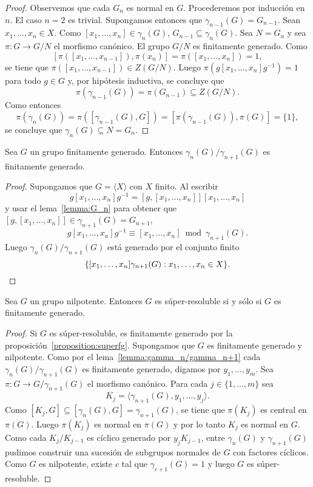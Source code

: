 \begin{proof}
	Observemos que cada $G_n$ es normal en $G$.  Procederemos por inducción en
	$n$. El caso $n=2$ es trivial. Supongamos entonces que
	$\gamma_{n-1}(G)=G_{n-1}$. Sean $x_1,\dots,x_n\in X$. Como
	$[x_1,\dots,x_n]\in\gamma_{n}(G)$, $G_{n-1}\subseteq\gamma_n(G)$. Sea
	$N=G_n$ y sea $\pi\colon G\to G/N$ el morfismo canónico. El grupo $G/N$ es
	finitamente generado. Como
	\[
	[\pi([x_1,\dots,x_{n-1}]),\pi(x_n)]=\pi([x_1,\dots,x_n])=1,
	\]
	se tiene que $\pi([x_1,\dots,x_{n-1}])\in Z(G/N)$. Luego
	$\pi(g[x_1,\dots,x_n]g^{-1})=1$ para todo $g\in G$ y, por hipótesis
	inductiva, 
	se concluye que 
	\[
	\pi(\gamma_{n-1}(G))=\pi(G_{n-1})\subseteq Z(G/N).
	\]
	Como entonces 
	\[
	\pi(\gamma_{n}(G))=\pi([\gamma_{n-1}(G),G])=[\pi(\gamma_{n-1}(G)),\pi(G)]=\{1\},
	\]
	se concluye que $\gamma_n(G)\subseteq N=G_n$.
\end{proof}

\begin{lemma}
	\label{lemma:gamma_n/gamma_n+1}
	Sea $G$ un grupo finitamente generado.  Entonces
	$\gamma_n(G)/\gamma_{n+1}(G)$ es finitamente generado. 
\end{lemma}

\begin{proof}
	Supongamos que $G=\langle X\rangle$ con $X$ finito. 
	Al escribir 
	\[
	g[x_1,\dots,x_n]g^{-1}=[g,[x_1,\dots,x_n]][x_1,\dots,x_n]
	\]
	y usar el lema~\ref{lemma:G_n} para obtener 
	que $[g,[x_1,\dots,x_n]]\in \gamma_{n+1}(G)=G_{n+1}$, 
	\[
	g[x_1,\dots,x_n]g^{-1}\equiv [x_1,\dots,x_n]\bmod \gamma_{n+1}(G). 
	\]
	Luego $\gamma_{n}(G)/\gamma_{n+1}(G)$ está generado por 
	el conjunto finito 
	\[
	\{[x_1,\dots,x_n]\gamma_{n+1}(G):x_1,\dots,x_n\in X\}. \qedhere 
	\]
\end{proof}

\begin{theorem}
	\label{theorem:super=fg}
	Sea $G$ un grupo nilpotente. Entonces $G$ es súper-resoluble si y sólo si
	$G$ es finitamente generado.
\end{theorem}

\begin{proof}
	Si $G$ es súper-resoluble, es finitamente generado por la
	proposición~\ref{proposition:superfg}.  Supongamos que $G$ es finitamente
	generado y nilpotente. Como por el lema~\ref{lemma:gamma_n/gamma_n+1} cada
	$\gamma_{n}(G)/\gamma_{n+1}(G)$ es finitamente generado, digamos por
	$y_1,\dots,y_m$. Sea $\pi\colon G\to G/\gamma_{n+1}(G)$ el morfismo
	canónico.  Para cada $j\in\{1,\dots,m\}$ sea 
	\[
	K_j=\langle \gamma_{n+1}(G),y_1,\dots,y_j\rangle.
	\]
	Como
	$[K_j,G]\subseteq [\gamma_n(G),G]=\gamma_{n+1}(G)$, 
	se tiene que $\pi(K_j)$ es central en $\pi(G)$. Luego $\pi(K_j)$ es normal
	en $\pi(G)$ y por lo tanto $K_j$ es normal en $G$. Como cada $K_j/K_{j-1}$
	es cíclico generado por $y_jK_{j-1}$, entre $\gamma_n(G)$ y
	$\gamma_{n+1}(G)$ pudimos construir una sucesión de subgrupos normales de
	$G$ con factores cíclicos. Como $G$ es nilpotente, existe $c$ tal que
	$\gamma_{c+1}(G)=1$ y luego $G$ es súper-resoluble.
\end{proof}

